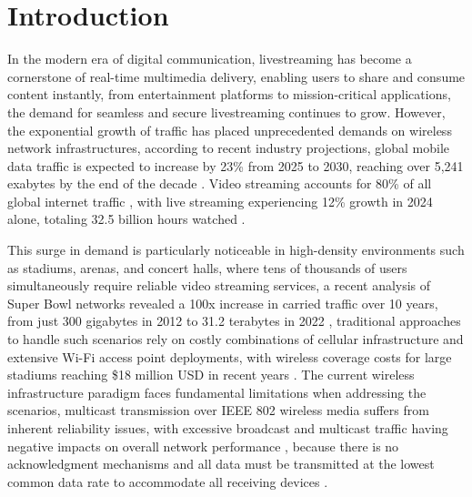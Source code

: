 
\chapter{Introduction}


\label{Introduction}

%

\quad In the modern era of digital communication, livestreaming has become a cornerstone of real-time multimedia delivery, enabling users to share and consume content instantly, from entertainment platforms to mission-critical applications, the demand for seamless and secure livestreaming continues to grow. However, the exponential growth of traffic has placed unprecedented demands on wireless network infrastructures, according to recent industry projections, global mobile data traffic is expected to increase by 23\% from 2025 to 2030, reaching over 5,241 exabytes by the end of the decade \cite{abiresearch2025}. Video streaming accounts for 80\% of all global internet traffic \cite{cisco2024}, with live streaming experiencing 12\% growth in 2024 alone, totaling 32.5 billion hours watched \cite{newscast2025}. 

\quad This surge in demand is particularly noticeable in high-density environments such as stadiums, arenas, and concert halls, where tens of thousands of users simultaneously require reliable video streaming services, a recent analysis of Super Bowl networks revealed a 100x increase in carried traffic over 10 years, from just 300 gigabytes in 2012 to 31.2 terabytes in 2022 \cite{stadiumtech2022}, traditional approaches to handle such scenarios rely on costly combinations of cellular infrastructure and extensive Wi-Fi access point deployments, with wireless coverage costs for large stadiums reaching \$18 million USD in recent years \cite{cisco2022}. The current wireless infrastructure paradigm faces fundamental limitations when addressing the scenarios, multicast transmission over IEEE 802 wireless media suffers from inherent reliability issues, with excessive broadcast and multicast traffic having negative impacts on overall network performance \cite{ ieee8022021}, because there is no acknowledgment mechanisms and all data must be transmitted at the lowest common data rate to accommodate all receiving devices \cite{wyebot2025}.

